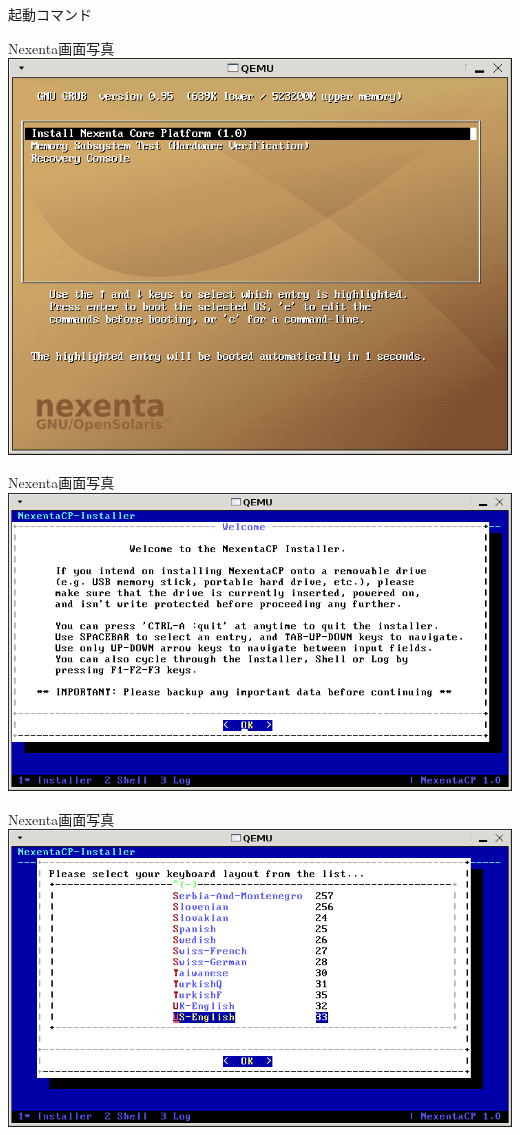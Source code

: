 \documentclass[cjk,dvipdfmx,12pt]{beamer}
\begin{document}
\begin{frame}[containsverbatim]{起動コマンド}
\end{frame}


\begin{frame}{Nexenta画面写真} 
\includegraphics[width=1.0\hsize]{image200804/nexenta1.png}
\end{frame}\begin{frame}{Nexenta画面写真} 
\includegraphics[width=1.0\hsize]{image200804/nexenta2.png}
\end{frame}\begin{frame}{Nexenta画面写真} 
\includegraphics[width=1.0\hsize]{image200804/nexenta3.png}

\end{frame}
\end{document}

